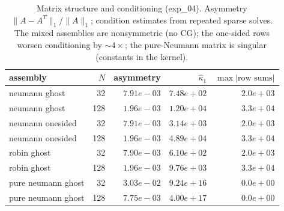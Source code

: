 \begin{table}[H]
\centering\small
\caption{Matrix structure and conditioning (exp\_04).  Asymmetry $\lVert A-A^T\rVert_1/\lVert A\rVert_1$; condition estimates from repeated sparse solves.  The mixed assemblies are nonsymmetric (no CG); the one-sided rows worsen conditioning by $\sim4\times$; the pure-Neumann matrix is singular (constants in the kernel).}
\label{tab:matrix}
\begin{tabular}{lrrrr}
\toprule
assembly & $N$ & asymmetry & $\hat\kappa_1$ & $\max|\text{row sums}|$ \\
\midrule
neumann ghost & 32 & $7.91e-03$ & $7.48e+02$ & $2.0e+03$ \\
neumann ghost & 128 & $1.96e-03$ & $1.20e+04$ & $3.3e+04$ \\
neumann onesided & 32 & $7.91e-03$ & $3.14e+03$ & $2.0e+03$ \\
neumann onesided & 128 & $1.96e-03$ & $4.89e+04$ & $3.3e+04$ \\
robin ghost & 32 & $7.90e-03$ & $6.10e+02$ & $2.0e+03$ \\
robin ghost & 128 & $1.96e-03$ & $9.76e+03$ & $3.3e+04$ \\
pure neumann ghost & 32 & $3.03e-02$ & $9.24e+16$ & $0.0e+00$ \\
pure neumann ghost & 128 & $7.75e-03$ & $4.00e+17$ & $0.0e+00$ \\
\bottomrule
\end{tabular}
\end{table}